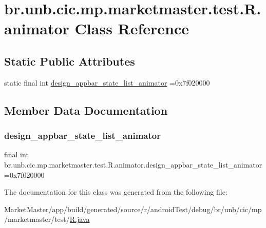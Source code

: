 \hypertarget{classbr_1_1unb_1_1cic_1_1mp_1_1marketmaster_1_1test_1_1R_1_1animator}{}\section{br.\+unb.\+cic.\+mp.\+marketmaster.\+test.\+R.\+animator Class Reference}
\label{classbr_1_1unb_1_1cic_1_1mp_1_1marketmaster_1_1test_1_1R_1_1animator}
\subsection*{Static Public Attributes}
\begin{DoxyCompactItemize}
\item 
static final int \mbox{\hyperlink{classbr_1_1unb_1_1cic_1_1mp_1_1marketmaster_1_1test_1_1R_1_1animator_aaab23b43cc536c5a61cbcd896b7fa0d0}{design\+\_\+appbar\+\_\+state\+\_\+list\+\_\+animator}} =0x7f020000
\end{DoxyCompactItemize}


\subsection{Member Data Documentation}
\mbox{\label{classbr_1_1unb_1_1cic_1_1mp_1_1marketmaster_1_1test_1_1R_1_1animator_aaab23b43cc536c5a61cbcd896b7fa0d0}} 
\subsubsection{\texorpdfstring{design\+\_\+appbar\+\_\+state\+\_\+list\+\_\+animator}{design\_appbar\_state\_list\_animator}}
{\footnotesize\ttfamily final int br.\+unb.\+cic.\+mp.\+marketmaster.\+test.\+R.\+animator.\+design\+\_\+appbar\+\_\+state\+\_\+list\+\_\+animator =0x7f020000\hspace{0.3cm}{\ttfamily [static]}}



The documentation for this class was generated from the following file\+:\begin{DoxyCompactItemize}
\item 
Market\+Master/app/build/generated/source/r/android\+Test/debug/br/unb/cic/mp/marketmaster/test/\mbox{\hyperlink{androidTest_2debug_2br_2unb_2cic_2mp_2marketmaster_2test_2R_8java}{R.\+java}}\end{DoxyCompactItemize}

